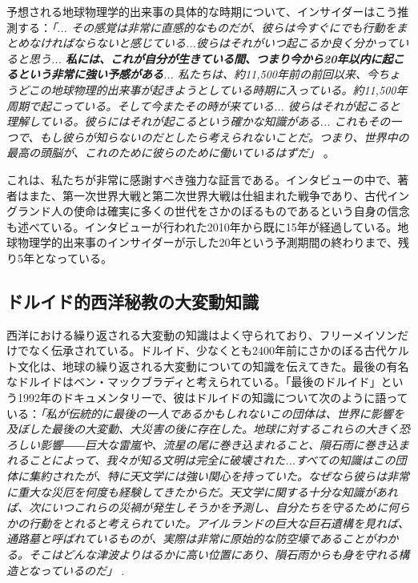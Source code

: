 \documentclass[10pt,twocolumn,letterpaper]{article}
\begin{document}
予想される地球物理学的出来事の具体的な時期について、インサイダーはこう推測する：\textit{「... その感覚は非常に直感的なものだが、彼らは今すぐにでも行動をまとめなければならないと感じている...彼らはそれがいつ起こるか良く分かっていると思う... \textbf{私には、これが自分が生きている間、つまり今から20年以内に起こるという非常に強い予感がある}... 私たちは、約11,500年前の前回以来、今ちょうどこの地球物理的出来事が起きようとしている時期に入っている。約11,500年周期で起こっている。そして今またその時が来ている... 彼らはそれが起こると理解している。彼らにはそれが起こるという確かな知識がある... これもその一つで、もし彼らが知らないのだとしたら考えられないことだ。つまり、世界中の最高の頭脳が、これのために彼らのために働いているはずだ」} \cite{4}。

これは、私たちが非常に感謝すべき強力な証言である。インタビューの中で、著者はまた、第一次世界大戦と第二次世界大戦は仕組まれた戦争であり、古代イングランド人の使命は確実に多くの世代をさかのぼるものであるという自身の信念も述べている。インタビューが行われた2010年から既に15年が経過している。地球物理学的出来事のインサイダーが示した20年という予測期間の終わりまで、残り5年となっている。

\subsection{ドルイド的西洋秘教の大変動知識}

西洋における繰り返される大変動の知識はよく守られており、フリーメイソンだけでなく伝承されている。ドルイド、少なくとも2400年前にさかのぼる古代ケルト文化は\cite{7}、地球の繰り返される大変動についての知識を伝えてきた。最後の有名なドルイドはベン・マックブラディと考えられている。「最後のドルイド」という1992年のドキュメンタリーで、彼はドルイドの知識について次のように語っている：\textit{「私が伝統的に最後の一人であるかもしれないこの団体は、世界に影響を及ぼした最後の大変動、大災害の後に存在した。地球に対するこれらの大きく恐ろしい影響――巨大な雷嵐や、流星の尾に巻き込まれること、隕石雨に巻き込まれることによって、我々が知る文明は完全に破壊された...すべての知識はこの団体に集約されたが、特に天文学には強い関心を持っていた。なぜなら彼らは非常に重大な災厄を何度も経験してきたからだ。天文学に関する十分な知識があれば、次にいつこれらの災禍が発生しそうかを予測し、自分たちを守るために何らかの行動をとれると考えられていた。アイルランドの巨大な巨石遺構を見れば、通路墓と呼ばれているものが、実際は非常に原始的な防空壕であることがわかる。そこはどんな津波よりはるかに高い位置にあり、隕石雨からも身を守れる構造となっているのだ」} \cite{8,9}.
\end{document}
